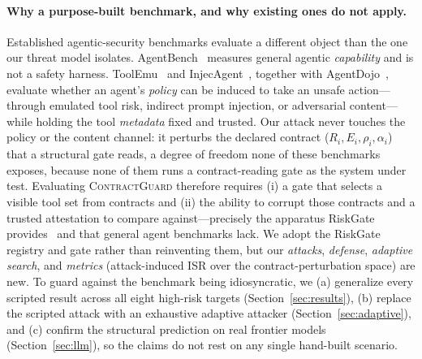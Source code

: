 \documentclass[conference,onecolumn]{IEEEtran}
\theoremstyle{definition}
\newcommand{\cg}{\textsc{ContractGuard}}
\begin{document}
\paragraph{Why a purpose-built benchmark, and why existing ones do not apply.}
Established agentic-security benchmarks evaluate a different object than the one
our threat model isolates. AgentBench~\cite{liu2023agentbench} measures general
agentic \emph{capability} and is not a safety harness. ToolEmu~\cite{ruan2024toolemu}
and InjecAgent~\cite{zhan2024injecagent}, together with
AgentDojo~\cite{debenedetti2024agentdojo}, evaluate whether an agent's
\emph{policy} can be induced to take an unsafe action---through emulated tool
risk, indirect prompt injection, or adversarial content---while holding the tool
\emph{metadata} fixed and trusted. Our attack never touches the policy or the
content channel: it perturbs the declared contract ($R_i,E_i,\rho_i,\alpha_i$)
that a structural gate reads, a degree of freedom none of these benchmarks
exposes, because none of them runs a contract-reading gate as the system under
test. Evaluating \cg{} therefore requires (i) a gate that selects a visible tool
set from contracts and (ii) the ability to corrupt those contracts and a trusted
attestation to compare against---precisely the apparatus RiskGate
provides~\cite{iyer2026racg} and that general agent benchmarks lack. We adopt the
RiskGate registry and gate rather than reinventing them, but our \emph{attacks},
\emph{defense}, \emph{adaptive search}, and \emph{metrics} (attack-induced ISR
over the contract-perturbation space) are new. To guard against the benchmark
being idiosyncratic, we (a) generalize every scripted result across all eight
high-risk targets (Section~\ref{sec:results}), (b) replace the scripted attack
with an exhaustive adaptive attacker (Section~\ref{sec:adaptive}), and (c)
confirm the structural prediction on real frontier models
(Section~\ref{sec:llm}), so the claims do not rest on any single hand-built
scenario.
\end{document}

